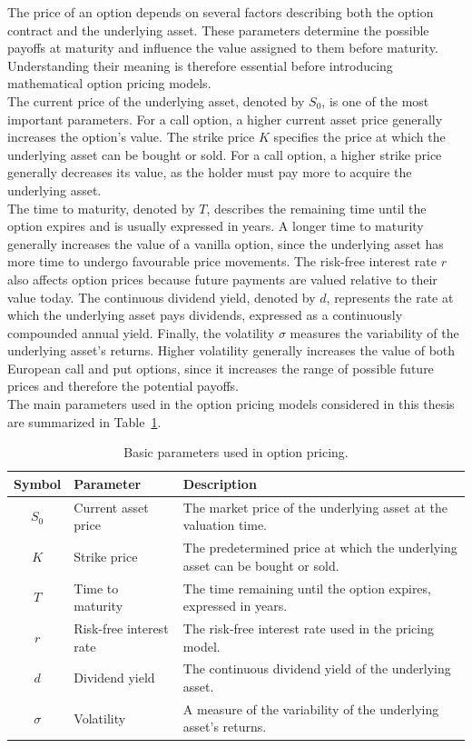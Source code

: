 \documentclass{article}
\begin{document}
	The price of an option depends on several factors describing both the option contract and the underlying asset. These parameters determine the possible payoffs at maturity and influence the value assigned to them before maturity. Understanding their meaning is therefore essential before introducing mathematical option pricing models.\\
	The current price of the underlying asset, denoted by \(S_0\), is one of the most important parameters. For a call option, a higher current asset price generally increases the option's value. The strike price \(K\) specifies the price at which the underlying asset can be bought or sold. For a call option, a higher strike price generally decreases its value, as the holder must pay more to acquire the underlying asset.\\
	The time to maturity, denoted by \(T\), describes the remaining time until the option expires and is usually expressed in years. A longer time to maturity generally increases the value of a vanilla option, since the underlying asset has more time to undergo favourable price movements. The risk-free interest rate \(r\) also affects option prices because future payments are valued relative to their value today. The continuous dividend yield, denoted by \(d\), represents the rate at which the underlying asset pays dividends, expressed as a continuously compounded annual yield. Finally, the volatility \(\sigma\) measures the variability of the underlying asset's returns. Higher volatility generally increases the value of both European call and put options, since it increases the range of possible future prices and therefore the potential payoffs. \\
	The main parameters used in the option pricing models considered in this thesis are summarized in Table~\ref{tab:option_parameters}.
	
	\begin{table}[H]
		\centering
		\begin{tabular}{c l p{8cm}}
			\toprule
			Symbol & Parameter & Description \\
			\midrule
			\(S_0\) & Current asset price & The market price of the underlying asset at the valuation time. \\
			\(K\) & Strike price & The predetermined price at which the underlying asset can be bought or sold. \\
			\(T\) & Time to maturity & The time remaining until the option expires, expressed in years. \\
			\(r\) & Risk-free interest rate & The risk-free interest rate used in the pricing model. \\
			\(d\) & Dividend yield & The continuous dividend yield of the underlying asset. \\
			\(\sigma\) & Volatility & A measure of the variability of the underlying asset's returns.\\
			\bottomrule
		\end{tabular}
		\caption{Basic parameters used in option pricing.}
		\label{tab:option_parameters}
	\end{table}
	
\end{document}

